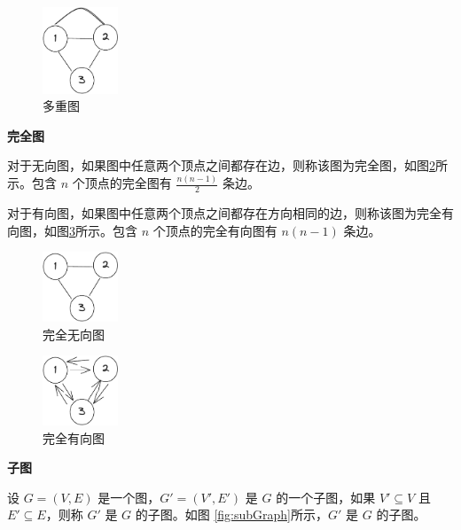 \documentclass[lang=cn,newtx,10pt,scheme=chinese]{elegantbook}
\begin{document}
  \begin{figure}[h!]
    \centering
    \includegraphics[width=0.2\textwidth]{./figure/pdf/cropped/mutipleGraph.pdf}
    \caption{多重图}
    \label{fig:multipleGraph}
  \end{figure}

\textbf{完全图}

对于无向图，如果图中任意两个顶点之间都存在边，则称该图为完全图，如图\ref{fig:completeGraph}所示。包含 $n$ 个顶点的完全图有 $\frac{n(n-1)}{2}$ 条边。

对于有向图，如果图中任意两个顶点之间都存在方向相同的边，则称该图为完全有向图，如图\ref{fig:completeDirectedGraph}所示。包含 $n$ 个顶点的完全有向图有 $n(n-1)$ 条边。

\begin{figure}[h!]
  \centering
  \includegraphics[width=0.2\textwidth]{./figure/pdf/cropped/unDirection.pdf}
  \caption{完全无向图}
  \label{fig:completeGraph}

\end{figure}

\begin{figure}[h!]
  \centering
  \includegraphics[width=0.2\textwidth]{./figure/pdf/cropped/directedComGraph.pdf}
  \caption{完全有向图}
  \label{fig:completeDirectedGraph}
\end{figure}


\textbf{子图}

设 $G = (V, E)$ 是一个图，$G' = (V', E')$ 是 $G$ 的一个子图，如果 $V' \subseteq V$ 且 $E' \subseteq E$，则称 $G'$ 是 $G$ 的子图。如图 \ref{fig:subGraph}所示，$G'$ 是 $G$ 的子图。
\end{document}
